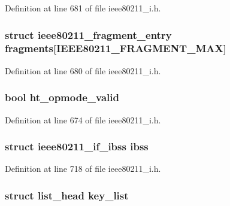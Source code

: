 Definition at line 681 of file ieee80211\-\_\-i.\-h.

\hypertarget{structieee80211__sub__if__data_a9dabb064f92940c0ae438c43f2e7d3a3}{
\subsubsection[{fragments}]{\setlength{\rightskip}{0pt plus 5cm}struct {\bf ieee80211\-\_\-fragment\-\_\-entry} fragments\mbox{[}{\bf I\-E\-E\-E80211\-\_\-\-F\-R\-A\-G\-M\-E\-N\-T\-\_\-\-M\-A\-X}\mbox{]}}}\label{structieee80211__sub__if__data_a9dabb064f92940c0ae438c43f2e7d3a3}


Definition at line 680 of file ieee80211\-\_\-i.\-h.

\hypertarget{structieee80211__sub__if__data_a1e7e518fe4dd44b1cb51205645f7c8e9}{
\subsubsection[{ht\-\_\-opmode\-\_\-valid}]{\setlength{\rightskip}{0pt plus 5cm}bool ht\-\_\-opmode\-\_\-valid}}\label{structieee80211__sub__if__data_a1e7e518fe4dd44b1cb51205645f7c8e9}


Definition at line 674 of file ieee80211\-\_\-i.\-h.

\hypertarget{structieee80211__sub__if__data_ac62d9e6d8045efd0110b40c2ce341b56}{
\subsubsection[{ibss}]{\setlength{\rightskip}{0pt plus 5cm}struct {\bf ieee80211\-\_\-if\-\_\-ibss} ibss}}\label{structieee80211__sub__if__data_ac62d9e6d8045efd0110b40c2ce341b56}


Definition at line 718 of file ieee80211\-\_\-i.\-h.

\hypertarget{structieee80211__sub__if__data_a173cf05f7d6b8bf98fc09f1bb95bfe7e}{
\subsubsection[{key\-\_\-list}]{\setlength{\rightskip}{0pt plus 5cm}struct list\-\_\-head key\-\_\-list}}\label{structieee80211__sub__if__data_a173cf05f7d6b8bf98fc09f1bb95bfe7e}


